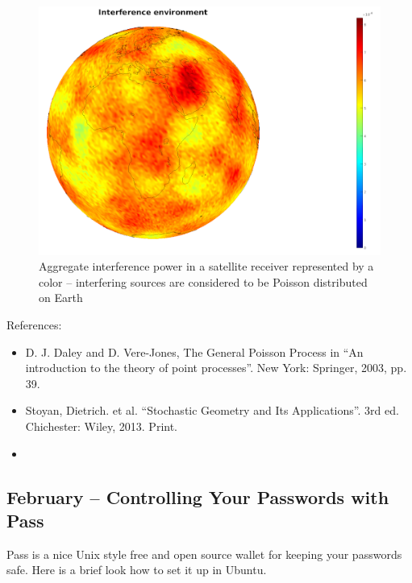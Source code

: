 \documentclass{article}
\begin{document}
\begin{figure}
  \includegraphics[width=\linewidth]{interferenceenvironment.png}
  \caption{Aggregate interference power in a satellite receiver represented by a color – interfering sources are considered to be Poisson distributed on Earth}
\end{figure}

References:
\begin{itemize}
\item D. J. Daley and D. Vere-Jones, The General Poisson Process in  ``An introduction to the theory of point processes''. New York: Springer, 2003, pp. 39. 
\item Stoyan, Dietrich. et al. ``Stochastic Geometry and Its Applications''. 3rd ed. Chichester: Wiley, 2013. Print.
\item  {}
\end{itemize}




\subsection{February – Controlling Your Passwords with Pass}
Pass is a nice Unix style free and open source wallet for keeping your passwords safe. Here is a brief look how to set it up in Ubuntu.
\end{document}
